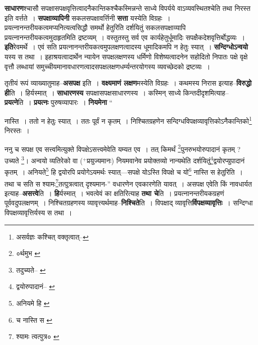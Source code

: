 \documentclass[article,12pt,a4paper]{memoir}
\newcommand{\add}[1]{($^{+}$#1)}
\begin{document}
	  \endgroup
	

	  \pstart \textbf{साधारण}श्चासौ सपक्षासपक्षवृत्तित्वादनैकान्तिकश्चैकस्मिन्नन्ते साध्ये विपर्यये वाऽव्यवस्थितश्चेति तथा निरस्त इति वर्त्तते । \textbf{सपक्षाव्यापिनी} सकलसपक्षावर्त्तिनी \textbf{सत्ता} यस्येति विग्रहः । प्रयत्नानन्तरीयकत्वमप्यनित्यत्वसिद्धौ समर्थो हेतुरिति दर्शयितुं सकलसपक्षाव्यापि प्रयत्नानन्तरीयकत्वमुदाहृतमिति द्रष्टव्यम् । वस्तुतस्तु सर्व एव कार्यहेतुर्धूमादिः सपक्षैकदेशवृत्तिर्बोद्धव्यः । \textbf{इति}रेवमर्थे । एवं सति प्रयत्नानन्तरीयकत्वमुपलक्षणत्वादस्य धूमादिकमपि न हेतुः स्यात् । \textbf{सन्दिग्धोऽन्वयो} यस्य स तथा । इहाश्रयत्वादार्थेन न्यायेन सपक्षलक्षणस्य धर्मिणो विशेष्यत्वादनेन सहोदितो निपातः पक्षे वृक्षे वृत्तौ लब्धायां समुच्चीयमानावधारणत्वादसपक्षलक्षणधर्म्यन्तरयोगस्य व्यवच्छेदको द्रष्टव्यः ।
	\pend
      

	  \pstart तृतीयं रूपं व्याख्यातुमाह--\textbf{असपक्ष} इति । \textbf{वक्ष्यमाणं लक्षण}मस्येति विग्रहः । कथमस्य निरास इत्याह--\textbf{विरुद्धो ही}ति । हिर्यस्मात् । \textbf{साधारणस्य} सपक्षासपक्षसाधारणस्य । कस्मिन् साध्ये किन्तदीदृशमित्याह--\textbf{प्रयत्ने}ति । \textbf{प्रयत्नः} पुरुषव्यापारः । \textbf{नियमेना}  \leavevmode{} “
	  
	नास्ति । ततो न हेतुः स्यात् । ततः पूर्वं न कृतम् । निश्चितग्रहणेन सन्दिग्धविपक्षव्यावृत्तिकोऽनैकान्तिको\footnote{असर्वज्ञः कश्चित् वक्तृत्वात्--\cite{dp-msD-n}} निरस्तः । 
	  
	ननु च सपक्ष एव सत्त्वमित्युक्ते विपक्षेऽसत्त्वमेवेति यम्यत एव । तत् किमर्थं \footnote{०र्थमुभ \cite{dp-msC} \cite{dp-msD}}\-पुनरुभयोरुपादानं कृतम् ? उच्यते \footnote{तदुच्यते--\cite{dp-msA} \cite{dp-edP} \cite{dp-edH} \cite{dp-edE}}\-। अन्वयो व्यतिरेको वा \add{प्रयुज्यमानः} नियमवानेव प्रयोक्तव्यो नान्यथेति दर्शयितुं\footnote{द्वयोरुपादानं--\cite{dp-msB} \cite{dp-msC} \cite{dp-msD}}\-द्वयोरप्युपादानं कृतम् । अनियते\footnote{अनियमे हि \cite{dp-msA} \cite{dp-edP} \cite{dp-edH} \cite{dp-edE} \cite{dp-edN}} हि द्वयोरपि प्रयोगेऽयमर्थः स्यात्—सपक्षे योऽस्ति विपक्षे च यो\footnote{च नास्ति स \cite{dp-msA} \cite{dp-msB} \cite{dp-msD} \cite{dp-edP} \cite{dp-edH} \cite{dp-edE} \cite{dp-edN}} नास्ति स हेतुरिति । तथा च सति स श्यामः\footnote{श्यामः त्वत्पुत्र० \cite{dp-msC}}\-तत्पुत्रत्वात् दृश्यमान-” वधारणेन एवकारणेति यावत् । असपक्ष एवेति किं नावधार्यत इत्याह--\textbf{असत्त्वे}ति । \textbf{हि}र्यस्मात् । भवत्वेवं का क्षतिरित्याह \textbf{तथा चे}ति । प्रयत्नानन्तरीयकग्रहणं पूर्ववदुपलक्षणम् । निश्चितग्रहणस्य व्यावृत्त्यर्थमाह--\textbf{निश्चिते}ति । विपक्षाद् व्यावृत्ति\textbf{र्विपक्षव्यावृत्तिः} । सन्दिग्धा विपक्षव्यावृत्तिर्यस्य स तथा ।
	\pend
      
\end{document}
